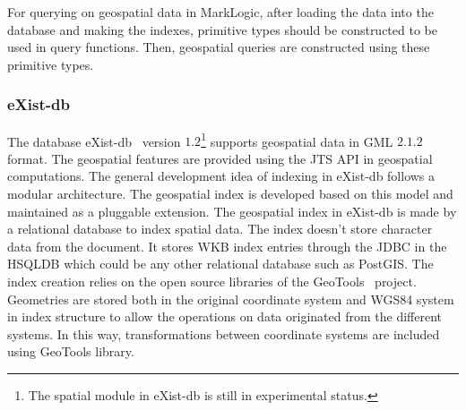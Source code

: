 \documentclass[a4paper,12pt]{article}
\begin{document}
For querying on geospatial data in MarkLogic, after loading the data into the database and making the indexes, primitive types should be constructed to be used in query functions. Then, geospatial queries are constructed using these primitive types. 

\subsubsection{eXist-db}

The database eXist-db~\cite{existdb} version $1.2$\footnote{The spatial module in eXist-db is still in experimental status.} supports geospatial data in GML $2.1.2$ format. The geospatial features are provided using the JTS API in geospatial computations. 
The general development idea of indexing in eXist-db follows a modular architecture.
The geospatial index is developed based on this model and maintained as a pluggable extension. 
The geospatial index in eXist-db is made by a relational database to index spatial data. The index doesn't store character data from the document. It stores WKB index entries through the JDBC in  the HSQLDB which could be any other relational database such as PostGIS. The index creation relies on the open source libraries of the GeoTools~\cite{geotools} project. Geometries are stored both in the original coordinate system and WGS84 system in index structure to allow the operations on data originated from the different systems. In this way, transformations between coordinate systems are included using GeoTools library.
 
\end{document}
